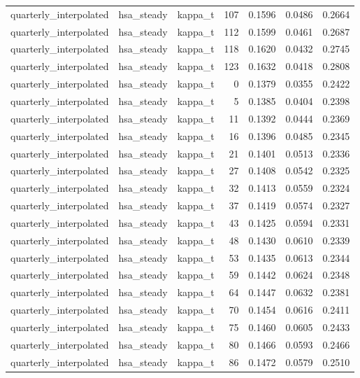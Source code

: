 \begin{tabular}{lllrrrr}
quarterly\_interpolated & hsa\_steady & kappa\_t & 107 & 0.1596 & 0.0486 & 0.2664 \\
quarterly\_interpolated & hsa\_steady & kappa\_t & 112 & 0.1599 & 0.0461 & 0.2687 \\
quarterly\_interpolated & hsa\_steady & kappa\_t & 118 & 0.1620 & 0.0432 & 0.2745 \\
quarterly\_interpolated & hsa\_steady & kappa\_t & 123 & 0.1632 & 0.0418 & 0.2808 \\
quarterly\_interpolated & hsa\_steady & kappa\_t & 0 & 0.1379 & 0.0355 & 0.2422 \\
quarterly\_interpolated & hsa\_steady & kappa\_t & 5 & 0.1385 & 0.0404 & 0.2398 \\
quarterly\_interpolated & hsa\_steady & kappa\_t & 11 & 0.1392 & 0.0444 & 0.2369 \\
quarterly\_interpolated & hsa\_steady & kappa\_t & 16 & 0.1396 & 0.0485 & 0.2345 \\
quarterly\_interpolated & hsa\_steady & kappa\_t & 21 & 0.1401 & 0.0513 & 0.2336 \\
quarterly\_interpolated & hsa\_steady & kappa\_t & 27 & 0.1408 & 0.0542 & 0.2325 \\
quarterly\_interpolated & hsa\_steady & kappa\_t & 32 & 0.1413 & 0.0559 & 0.2324 \\
quarterly\_interpolated & hsa\_steady & kappa\_t & 37 & 0.1419 & 0.0574 & 0.2327 \\
quarterly\_interpolated & hsa\_steady & kappa\_t & 43 & 0.1425 & 0.0594 & 0.2331 \\
quarterly\_interpolated & hsa\_steady & kappa\_t & 48 & 0.1430 & 0.0610 & 0.2339 \\
quarterly\_interpolated & hsa\_steady & kappa\_t & 53 & 0.1435 & 0.0613 & 0.2344 \\
quarterly\_interpolated & hsa\_steady & kappa\_t & 59 & 0.1442 & 0.0624 & 0.2348 \\
quarterly\_interpolated & hsa\_steady & kappa\_t & 64 & 0.1447 & 0.0632 & 0.2381 \\
quarterly\_interpolated & hsa\_steady & kappa\_t & 70 & 0.1454 & 0.0616 & 0.2411 \\
quarterly\_interpolated & hsa\_steady & kappa\_t & 75 & 0.1460 & 0.0605 & 0.2433 \\
quarterly\_interpolated & hsa\_steady & kappa\_t & 80 & 0.1466 & 0.0593 & 0.2466 \\
quarterly\_interpolated & hsa\_steady & kappa\_t & 86 & 0.1472 & 0.0579 & 0.2510 \\

\end{tabular}
